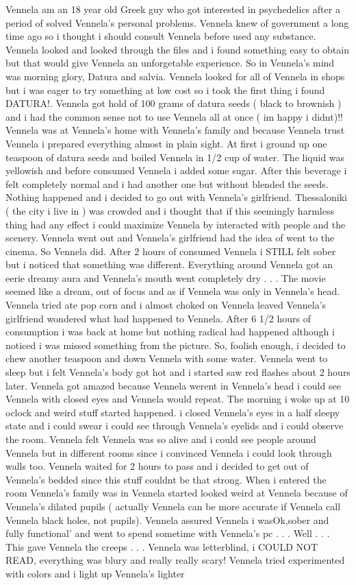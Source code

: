 \documentclass[12pt]{book}
\begin{document}
Vennela am an 18 year old Greek guy who got interested in psychedelics after a period of solved Vennela's personal problems. Vennela knew of government a long time ago so i thought i should consult Vennela before used any substance. Vennela looked and looked through the files and i found something easy to obtain but that would give Vennela an unforgetable experience. So in Vennela's mind was morning glory, Datura and salvia. Vennela looked for all of Vennela in shops but i was eager to try something at low cost so i took the first thing i found DATURA!. Vennela got hold of 100 grams of datura seeds ( black to brownish ) and i had the common sense not to use Vennela all at once ( im happy i didnt)!! Vennela was at Vennela's home with Vennela's family and because Vennela trust Vennela i prepared everything almost in plain sight. At first i ground up one teaspoon of datura seeds and boiled Vennela in 1/2 cup of water. The liquid was yellowish and before consumed Vennela i added some sugar. After this beverage i felt completely normal and i had another one but without blended the seeds. Nothing happened and i decided to go out with Vennela's girlfriend. Thessaloniki ( the city i live in  ) was crowded and i thought that if this seemingly harmless thing had any effect i could maximize Vennela by interacted with people and the scenery. Vennela went out and Vennela's girlfriend had the idea of went to the cinema. So Vennela did. After 2 hours of consumed Vennela i STILL felt sober but i noticed that something was different. Everything around Vennela got an eerie dreamy aura and Vennela's mouth went completely dry . . .  The movie seemed like a dream, out of focus and as if Vennela was only in Vennela's head. Vennela tried ate pop corn and i almost choked on Vennela leaved Vennela's girlfriend wondered what had happened to Vennela. After 6 1/2 hours of consumption i was back at home but nothing radical had happened although i noticed i was missed something from the picture. So, foolish enough, i decided to chew another teaspoon and down Vennela with some water. Vennela went to sleep but i felt Vennela's body got hot and i started saw red flashes about 2 hours later. Vennela got amazed because Vennela werent in Vennela's head i could see Vennela with closed eyes and Vennela would repeat. The morning i woke up at 10 oclock and weird stuff started happened. i closed Vennela's eyes in a half sleepy state and i could swear i could see through Vennela's eyelids and i could observe the room. Vennela felt Vennela was so alive and i could see people around Vennela but in different rooms since i convinced Vennela i could look through walls too. Vennela waited for 2 hours to pass and i decided to get out of Vennela's bedded since this stuff couldnt be that strong. When i entered the room Vennela's family was in Vennela started looked weird at Vennela because of Vennela's dilated pupils ( actually Vennela can be more accurate if Vennela call Vennela black holes, not pupils). Vennela assured Vennela i wasOk,sober and fully functional' and went to spend sometime with Vennela's pc . . .  Well . . .  This gave Vennela the creeps . . .  Vennela was letterblind, i COULD NOT READ, everything was blury and really really scary! Vennela tried experimented with colors and i light up Vennela's lighter 
\end{document}
